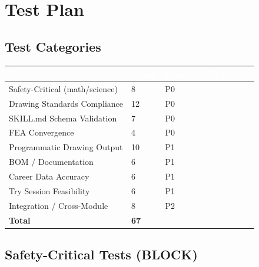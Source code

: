\documentclass[11pt,letterpaper]{article}
\newcommand{\tableheader}[1]{\textbf{\sffamily\textcolor{white}{#1}}}
\newcommand{\blocktag}{\textcolor{blockred}{\textbf{\sffamily[BLOCK]}}}
\newcommand{\gatetag}{\textcolor{gateyellow}{\textbf{\sffamily[GATE]}}}
\newcommand{\annotag}{\textcolor{annogreen}{\textbf{\sffamily[ANNOTATE]}}}
\begin{document}
\section{Test Plan}

\subsection{Test Categories}

\begin{center}
\begin{tabularx}{\textwidth}{L{3.5cm}C{1.5cm}L{2cm}X}
\toprule
{}
\tableheader{Category} & \tableheader{Count} & \tableheader{Priority} & \tableheader{On Failure} \\
\midrule
Safety-Critical (math/science) & 8 & P0 & \blocktag \\
Drawing Standards Compliance & 12 & P0 & \blocktag \\
SKILL.md Schema Validation & 7 & P0 & \blocktag \\
FEA Convergence & 4 & P0 & \gatetag \\
Programmatic Drawing Output & 10 & P1 & \gatetag \\
BOM / Documentation & 6 & P1 & \annotag \\
Career Data Accuracy & 6 & P1 & \annotag \\
Try Session Feasibility & 6 & P1 & \annotag \\
Integration / Cross-Module & 8 & P2 & \annotag \\
\midrule
\textbf{Total} & \textbf{67} & & \\
\bottomrule
\end{tabularx}
\end{center}

\subsection{Safety-Critical Tests (BLOCK)}
\end{document}
